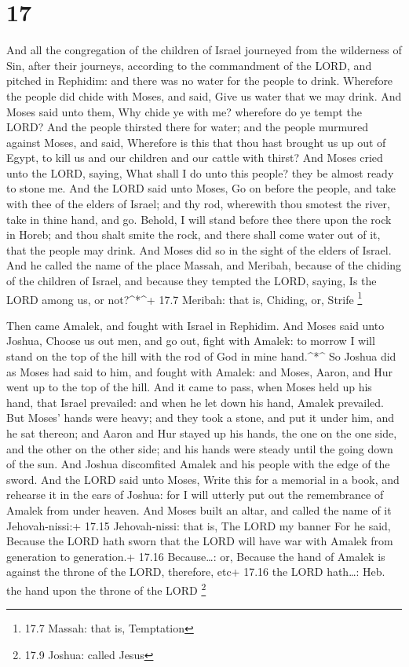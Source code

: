 \hypertarget{section-16}{%
\section{17}\label{section-16}}

 And all the congregation of the children of Israel
journeyed from the wilderness of Sin, after their journeys, according to
the commandment of the LORD, and pitched in Rephidim: and there was no
water for the people to drink.  Wherefore the people did
chide with Moses, and said, Give us water that we may drink. And Moses
said unto them, Why chide ye with me? wherefore do ye tempt the LORD?
 And the people thirsted there for water; and the people
murmured against Moses, and said, Wherefore is this that thou hast
brought us up out of Egypt, to kill us and our children and our cattle
with thirst?  And Moses cried unto the LORD, saying, What
shall I do unto this people? they be almost ready to stone me.
 And the LORD said unto Moses, Go on before the people, and
take with thee of the elders of Israel; and thy rod, wherewith thou
smotest the river, take in thine hand, and go.  Behold, I
will stand before thee there upon the rock in Horeb; and thou shalt
smite the rock, and there shall come water out of it, that the people
may drink. And Moses did so in the sight of the elders of Israel.
 And he called the name of the place Massah, and Meribah,
because of the chiding of the children of Israel, and because they
tempted the LORD, saying, Is the LORD among us, or not?\^{}*\^{}+ 17.7
Meribah: that is, Chiding, or, Strife \footnote{17.7 Massah: that is,
  Temptation}

 Then came Amalek, and fought with Israel in Rephidim.
 And Moses said unto Joshua, Choose us out men, and go out,
fight with Amalek: to morrow I will stand on the top of the hill with
the rod of God in mine hand.\^{}*\^{}  So Joshua did as
Moses had said to him, and fought with Amalek: and Moses, Aaron, and Hur
went up to the top of the hill.  And it came to pass, when
Moses held up his hand, that Israel prevailed: and when he let down his
hand, Amalek prevailed.  But Moses' hands were heavy; and
they took a stone, and put it under him, and he sat thereon; and Aaron
and Hur stayed up his hands, the one on the one side, and the other on
the other side; and his hands were steady until the going down of the
sun.  And Joshua discomfited Amalek and his people with the
edge of the sword.  And the LORD said unto Moses, Write
this for a memorial in a book, and rehearse it in the ears of Joshua:
for I will utterly put out the remembrance of Amalek from under heaven.
 And Moses built an altar, and called the name of it
Jehovah-nissi:+ 17.15 Jehovah-nissi: that is, The LORD my banner
 For he said, Because the LORD hath sworn that the LORD
will have war with Amalek from generation to generation.+ 17.16
Because\ldots: or, Because the hand of Amalek is against the throne of
the LORD, therefore, etc+ 17.16 the LORD hath\ldots: Heb. the hand upon
the throne of the LORD \footnote{17.9 Joshua: called Jesus}

